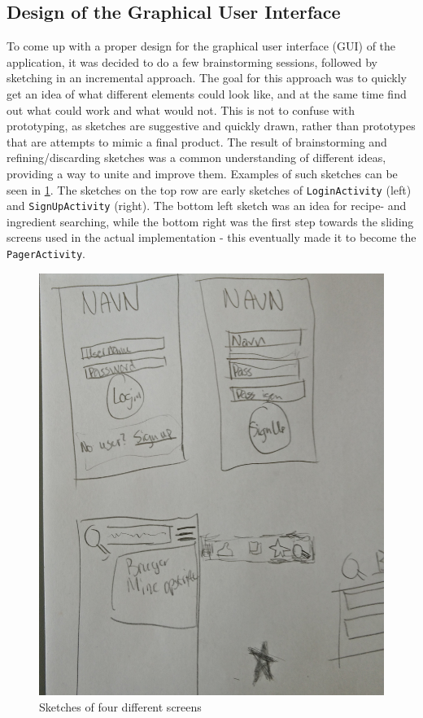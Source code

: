 \subsection{Design of the Graphical User Interface}
\label{subsec:designgui}

To come up with a proper design for the graphical user interface (GUI) of the application, it was decided to do a few brainstorming sessions, followed by sketching in an incremental approach. The goal for this approach was to quickly get an idea of what different elements could look like, and at the same time find out what could work and what would not. This is not to confuse with prototyping, as sketches are suggestive and quickly drawn, rather than prototypes that are attempts to mimic a final product.
The result of brainstorming and refining/discarding sketches was a common understanding of different ideas, providing a way to unite and improve them. Examples of such sketches can be seen in \ref{fig:prototype_brainstorming}. The sketches on the top row are early sketches of \texttt{LoginActivity} (left) and \texttt{SignUpActivity} (right). The bottom left sketch was an idea for recipe- and ingredient searching, while the bottom right was the first step towards the sliding screens used in the actual implementation - this eventually made it to become the \texttt{PagerActivity}.

\begin{figure}[H]
	\centering
	\includegraphics[width=\textwidth]{Pictures/prototype_brainstorming.jpg}
	\caption{Sketches of four different screens}
	\label{fig:prototype_brainstorming}
\end{figure}

